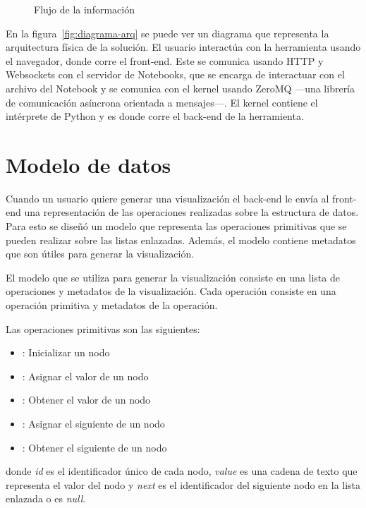 \begin{figure}[htb]
    \centering
    
    \caption{Flujo de la información}
    \label{fig:flujo-informacion}
\end{figure}

En la figura~\ref{fig:diagrama-arq} se puede ver un diagrama que representa la arquitectura física de la solución. El usuario interactúa con la herramienta usando el navegador, donde corre el front-end. Este se comunica usando HTTP y Websockets con el servidor de Notebooks, que se encarga de interactuar con el archivo del Notebook y se comunica con el kernel usando ZeroMQ ---una librería de comunicación asíncrona orientada a mensajes---. El kernel contiene el intérprete de Python y es donde corre el back-end de la herramienta.

\section{Modelo de datos}
\label{sec:modelo-de-datos}

Cuando un usuario quiere generar una visualización el back-end le envía al front-end una representación de las operaciones realizadas sobre la estructura de datos. Para esto se diseñó un modelo que representa las operaciones primitivas que se pueden realizar sobre las listas enlazadas. Además, el modelo contiene metadatos que son útiles para generar la visualización.

El modelo que se utiliza para generar la visualización consiste en una lista de operaciones y metadatos de la visualización. Cada operación consiste en una operación primitiva y metadatos de la operación.

Las operaciones primitivas son las siguientes:
\begin{itemize}
    \item{}: Inicializar un nodo
    \item{}: Asignar el valor de un nodo
    \item{}: Obtener el valor de un nodo
    \item{}: Asignar el siguiente de un nodo
    \item{}: Obtener el siguiente de un nodo
\end{itemize}
donde \textit{id} es el identificador único de cada nodo, \textit{value} es una cadena de texto que representa el valor del nodo y \textit{next} es el identificador del siguiente nodo en la lista enlazada o es \textit{null}.

